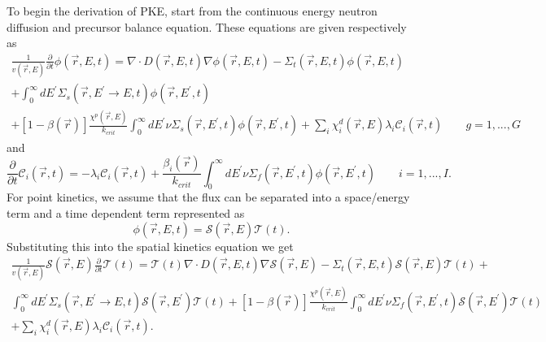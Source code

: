 \documentclass{ansconf}
\numberwithin{equation}{section}
\begin{document}
To begin the derivation of PKE, start from the continuous energy neutron diffusion and precursor balance equation. These equations are given respectively as
\begin{multline}
\frac{1}{v\left(\vec{r},E\right)}\frac{\partial}{\partial t}\phi\left(\vec{r},E,t\right)=\nabla\cdot D\left(\vec{r},E,t\right)\nabla\phi\left(\vec{r},E,t\right)-
\Sigma_{t}\left(\vec{r},E,t\right)\phi\left(\vec{r},E,t\right)\\ 
+\int_{0}^{\infty}dE^{\prime}\Sigma_{s}\left(\vec{r},E^{\prime}
\rightarrow E,t\right)\phi\left(\vec{r},E^{\prime},t\right)\\ 
+\left[1-\beta\left(\vec{r}\right)\right]
\frac{\chi^{p}\left(\vec{r},E\right)}{k_{crit}}\int_{0}^{\infty}dE^{\prime}\nu\Sigma_{s}
\left(\vec{r},E^{\prime},t\right)
\phi\left(\vec{r},E^{\prime},t\right)+
\sum_{i}\chi_{i}^{d}\left(\vec{r},E\right)
\lambda_{i}\mathcal{C}_{i}\left(\vec{r},t\right)\qquad g=1,...,G
\end{multline}
and
\begin{equation}
\frac{\partial}{\partial t}\mathcal{C}_{i}\left(\vec{r},t\right)=-\lambda_{i}\mathcal{C}_{i}\left(\vec{r},t\right)+\frac{\beta_{i}\left(\vec{r}\right)}{k_{crit}}\int_{0}^{\infty}dE^{\prime}\nu\Sigma_{f}\left(\vec{r},E^{\prime},t\right)\phi\left(\vec{r},E^{\prime},t\right)\qquad i=1,...,I.
\end{equation}
For point kinetics, we assume that the flux can be separated into a space/energy term and a time dependent term represented as 
\begin{equation}
\phi\left(\vec{r},E,t\right)=\mathcal{S}\left(\vec{r},E\right)
\mathcal{T}\left(t\right).
\end{equation}
 Substituting this into the spatial kinetics equation we get
\begin{multline}
\frac{1}{v\left(\vec{r},E\right)}\mathcal{S}\left(\vec{r},E\right)\frac{\partial}{\partial t}\mathcal{T}\left(t\right)=\mathcal{T}\left(t\right)\nabla\cdot D\left(\vec{r},E,t\right)\nabla\mathcal{S}\left(\vec{r},E\right)-\Sigma_{t}\left(\vec{r},E,t\right)\mathcal{S}\left(\vec{r},E\right)\mathcal{T}\left(t\right)+\\
\int_{0}^{\infty}dE^{\prime}\Sigma_{s}\left(\vec{r},E^{\prime}\rightarrow E,t\right)\mathcal{S}\left(\vec{r},E^{\prime}\right)\mathcal{T}\left(t\right)+\left[1-\beta\left(\vec{r}\right)\right]\frac{\chi^{p}\left(\vec{r},E\right)}{k_{crit}}\int_{0}^{\infty}dE^{\prime}\nu\Sigma_{f}\left(\vec{r},E^{\prime},t\right)\mathcal{S}\left(\vec{r},E^{\prime}\right)\mathcal{T}\left(t\right)\\
+\sum_{i}\chi_{i}^{d}\left(\vec{r},E\right)\lambda_{i}\mathcal{C}_{i}\left(\vec{r},t\right).
\end{multline}
\end{document}
